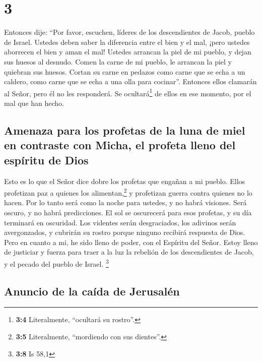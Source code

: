 \hypertarget{section-2}{%
\section{3}\label{section-2}}

 Entonces dije: ``Por favor, escuchen, líderes de los
descendientes de Jacob, pueblo de Israel. Ustedes deben saber la
diferencia entre el bien y el mal,  ¡pero ustedes
aborrecen el bien y aman el mal! Ustedes arrancan la piel de mi pueblo,
y dejan sus huesos al desnudo.  Comen la carne de mi
pueblo, le arrancan la piel y quiebran sus huesos. Cortan su carne en
pedazos como carne que se echa a un caldero, como carne que se echa a
una olla para cocinar''.  Entonces ellos clamarán al
Señor, pero él no les responderá. Se ocultará\footnote{\textbf{3:4}
  Literalmente, ``ocultará su rostro''.} de ellos en ese momento, por el
mal que han hecho.

\hypertarget{amenaza-para-los-profetas-de-la-luna-de-miel-en-contraste-con-micha-el-profeta-lleno-del-espuxedritu-de-dios}{%
\subsection{Amenaza para los profetas de la luna de miel en contraste
con Micha, el profeta lleno del espíritu de
Dios}\label{amenaza-para-los-profetas-de-la-luna-de-miel-en-contraste-con-micha-el-profeta-lleno-del-espuxedritu-de-dios}}

 Esto es lo que el Señor dice dobre los profetas que
engañan a mi pueblo. Ellos profetizan paz a quienes los
alimentan,\footnote{\textbf{3:5} Literalmente, ``mordiendo con sus
  dientes''.} y profetizan guerra contra quienes no lo hacen.
 Por lo tanto será como la noche para ustedes, y no habrá
visiones. Será oscuro, y no habrá predicciones. El sol se oscurecerá
para esos profetas, y su día terminará en oscuridad.  Los
videntes serán desgraciados, los adivinos serán avergonzados, y cubrirán
su rostro porque ninguno recibirá respuesta de Dios.  Pero
en cuanto a mi, he sido lleno de poder, con el Espíritu del Señor. Estoy
lleno de justiciar y fuerza para traer a la luz la rebelión de los
descendientes de Jacob, y el pecado del pueblo de Israel. \footnote{\textbf{3:8}
  Is 58,1}

\hypertarget{anuncio-de-la-cauxedda-de-jerusaluxe9n}{%
\subsection{Anuncio de la caída de
Jerusalén}\label{anuncio-de-la-cauxedda-de-jerusaluxe9n}}

